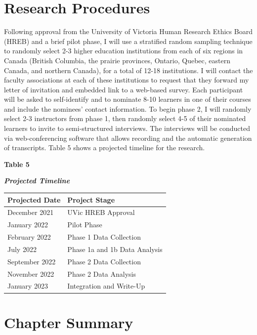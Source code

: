 \documentclass[
]{book}
\begin{document}
\hypertarget{research-procedures}{%
\section*{Research Procedures}\label{research-procedures}}

Following approval from the University of Victoria Human Research Ethics Board (HREB) and a brief pilot phase, I will use a stratified random sampling technique to randomly select 2-3 higher education institutions from each of six regions in Canada (British Columbia, the prairie provinces, Ontario, Quebec, eastern Canada, and northern Canada), for a total of 12-18 institutions. I will contact the faculty associations at each of these institutions to request that they forward my letter of invitation and embedded link to a web-based survey. Each participant will be asked to self-identify and to nominate 8-10 learners in one of their courses and include the nominees' contact information. To begin phase 2, I will randomly select 2-3 instructors from phase 1, then randomly select 4-5 of their nominated learners to invite to semi-structured interviews. The interviews will be conducted via web-conferencing software that allows recording and the automatic generation of transcripts. Table 5 shows a projected timeline for the research.

\textbf{Table 5}

\textbf{\emph{Projected Timeline}}

\begin{longtable}[]{@{}ll@{}}
\toprule
Projected Date & Project Stage \\
\midrule
\endhead
December 2021 & UVic HREB Approval \\
January 2022 & Pilot Phase \\
February 2022 & Phase 1 Data Collection \\
July 2022 & Phase 1a and 1b Data Analysis \\
September 2022 & Phase 2 Data Collection \\
November 2022 & Phase 2 Data Analysis \\
January 2023 & Integration and Write-Up \\
\bottomrule
\end{longtable}

\hypertarget{chapter-summary}{%
\section*{Chapter Summary}\label{chapter-summary}}
\end{document}

